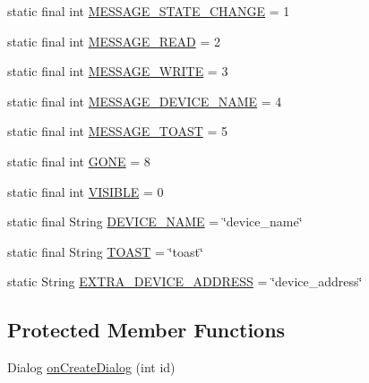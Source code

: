 \begin{DoxyCompactItemize}
\item 
static final int \hyperlink{classcom_1_1example_1_1android_1_1_bluetooth_chat_1_1_l_a_s_a_r_control_a54eaad8c061d8286ba78ae22323a4f2a}{M\-E\-S\-S\-A\-G\-E\-\_\-\-S\-T\-A\-T\-E\-\_\-\-C\-H\-A\-N\-G\-E} = 1
\item 
static final int \hyperlink{classcom_1_1example_1_1android_1_1_bluetooth_chat_1_1_l_a_s_a_r_control_ab0d2082ba2cfcb36adabfec0fb604e28}{M\-E\-S\-S\-A\-G\-E\-\_\-\-R\-E\-A\-D} = 2
\item 
static final int \hyperlink{classcom_1_1example_1_1android_1_1_bluetooth_chat_1_1_l_a_s_a_r_control_a1b526d54fa3f99e607ff4a1e17cfa136}{M\-E\-S\-S\-A\-G\-E\-\_\-\-W\-R\-I\-T\-E} = 3
\item 
static final int \hyperlink{classcom_1_1example_1_1android_1_1_bluetooth_chat_1_1_l_a_s_a_r_control_add64add7196452d793891b8d0805cb8f}{M\-E\-S\-S\-A\-G\-E\-\_\-\-D\-E\-V\-I\-C\-E\-\_\-\-N\-A\-M\-E} = 4
\item 
static final int \hyperlink{classcom_1_1example_1_1android_1_1_bluetooth_chat_1_1_l_a_s_a_r_control_aeb3b8c4dc7dfb4ee445d2d4afc5b65c0}{M\-E\-S\-S\-A\-G\-E\-\_\-\-T\-O\-A\-S\-T} = 5
\item 
static final int \hyperlink{classcom_1_1example_1_1android_1_1_bluetooth_chat_1_1_l_a_s_a_r_control_af184001c124497a8668c657a12086ec6}{G\-O\-N\-E} = 8
\item 
static final int \hyperlink{classcom_1_1example_1_1android_1_1_bluetooth_chat_1_1_l_a_s_a_r_control_ace98d3d6a968cb69d71e71476d37b8c0}{V\-I\-S\-I\-B\-L\-E} = 0
\item 
static final String \hyperlink{classcom_1_1example_1_1android_1_1_bluetooth_chat_1_1_l_a_s_a_r_control_aeb66e03c65cb4e4c8cecd9b5e9542612}{D\-E\-V\-I\-C\-E\-\_\-\-N\-A\-M\-E} = \char`\"{}device\-\_\-name\char`\"{}
\item 
static final String \hyperlink{classcom_1_1example_1_1android_1_1_bluetooth_chat_1_1_l_a_s_a_r_control_adafe8a0d70641fa1cab3d27fa09742e7}{T\-O\-A\-S\-T} = \char`\"{}toast\char`\"{}
\item 
static String \hyperlink{classcom_1_1example_1_1android_1_1_bluetooth_chat_1_1_l_a_s_a_r_control_adfb4e91cee59f339c15f8ae793db217a}{E\-X\-T\-R\-A\-\_\-\-D\-E\-V\-I\-C\-E\-\_\-\-A\-D\-D\-R\-E\-S\-S} = \char`\"{}device\-\_\-address\char`\"{}
\end{DoxyCompactItemize}
\subsection*{Protected Member Functions}
\begin{DoxyCompactItemize}
\item 
Dialog \hyperlink{classcom_1_1example_1_1android_1_1_bluetooth_chat_1_1_l_a_s_a_r_control_a3c6dd4273e9b563fbffdd8bad1cc6cf2}{on\-Create\-Dialog} (int id)
\end{DoxyCompactItemize}
